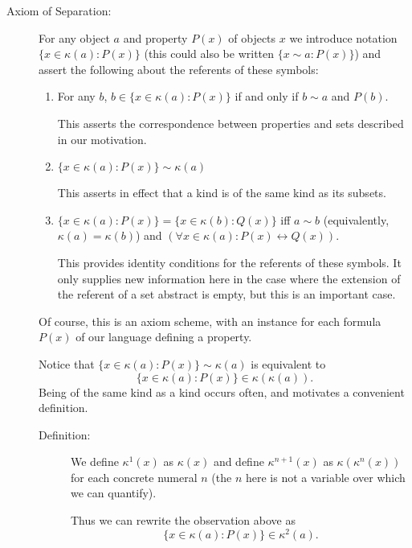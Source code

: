 \documentclass[12pt]{article}
\begin{document}
\begin{description}

\item[Axiom of Separation:]  For any object $a$ and property $P(x)$ of objects $x$ we introduce notation $\{x \in \kappa(a):P(x)\}$ (this could also be written $\{x \sim a:P(x)\}$) and assert the following about the referents of these symbols:

\begin{enumerate}

\item For any $b$, $b \in \{x \in \kappa(a):P(x)\}$ if and only if $b \sim a$ and $P(b)$.

This asserts the correspondence between properties and sets described in our motivation.

\item  $\{x \in \kappa(a):P(x)\} \sim \kappa(a)$

This asserts in effect that a kind is of the same kind as its subsets.

\item $\{x \in \kappa(a):P(x)\} = \{x \in \kappa(b):Q(x)\}$ iff $a \sim b$ (equivalently, $\kappa(a)=\kappa(b)$) and $(\forall x\in \kappa(a):P(x) \leftrightarrow Q(x)).$

This provides identity conditions for the referents of these symbols.  It only supplies new information here in the case where the extension of the referent of a set abstract is empty, but this is an important case.

\end{enumerate}



Of course, this is an axiom scheme, with an instance for each formula $P(x)$ of our language defining a property.

Notice that $\{x \in \kappa(a):P(x)\} \sim \kappa(a)$  is equivalent to $$\{x \in \kappa(a):P(x)\} \in \kappa(\kappa(a)).$$
  Being of the same kind as a kind occurs often, and motivates a convenient definition.

\begin{description}

\item[Definition:]  We define $\kappa^1(x)$ as $\kappa(x)$ and define $\kappa^{n+1}(x)$ as $\kappa(\kappa^n(x))$ for each concrete numeral $n$ (the $n$ here is not a variable over which we can quantify).

Thus we can rewrite the observation above as $$\{x \in \kappa(a):P(x)\} \in \kappa^2(a).$$


\end{description}
\end{description}
\end{document}
